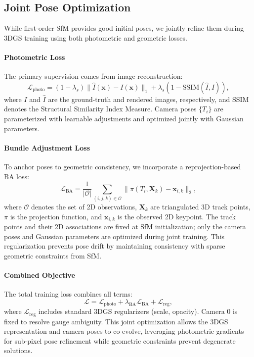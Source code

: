 \documentclass[sigconf]{acmart}
\begin{document}
\subsection{Joint Pose Optimization}
\label{sec:pose_opt}

While first-order SfM provides good initial poses, we jointly refine them during 3DGS training using both photometric and geometric losses.

\paragraph{Photometric Loss}
The primary supervision comes from image reconstruction:
\begin{equation}
    \mathcal{L}_{\text{photo}} = (1 - \lambda_s) \| \hat{I}(\mathbf{x}) - I(\mathbf{x}) \|_1 + \lambda_s (1 - \text{SSIM}(\hat{I}, I)),
\end{equation}
where $I$ and $\hat{I}$ are the ground-truth and rendered images, respectively, and SSIM denotes the Structural Similarity Index Measure. Camera poses $\{T_i\}$ are parameterized with learnable adjustments and optimized jointly with Gaussian parameters.

\paragraph{Bundle Adjustment Loss}
To anchor poses to geometric consistency, we incorporate a reprojection-based BA loss:
\begin{equation}
    \mathcal{L}_{\text{BA}} = \frac{1}{|\mathcal{O}|} \sum_{(i,j,k) \in \mathcal{O}} \| \pi(T_i, \mathbf{X}_k) - \mathbf{x}_{i,k} \|_2,
\end{equation}
where $\mathcal{O}$ denotes the set of 2D observations, $\mathbf{X}_k$ are triangulated 3D track points, $\pi$ is the projection function, and $\mathbf{x}_{i,k}$ is the observed 2D keypoint. The track points and their 2D associations are fixed at SfM initialization; only the camera poses and Gaussian parameters are optimized during joint training. This regularization prevents pose drift by maintaining consistency with sparse geometric constraints from SfM.

\paragraph{Combined Objective}
The total training loss combines all terms:
\begin{equation}
    \mathcal{L} = \mathcal{L}_{\text{photo}} + \lambda_{\text{BA}} \mathcal{L}_{\text{BA}} + \mathcal{L}_{\text{reg}},
\end{equation}
where $\mathcal{L}_{\text{reg}}$ includes standard 3DGS regularizers (scale, opacity). Camera 0 is fixed to resolve gauge ambiguity. This joint optimization allows the 3DGS representation and camera poses to co-evolve, leveraging photometric gradients for sub-pixel pose refinement while geometric constraints prevent degenerate solutions.
\end{document}
